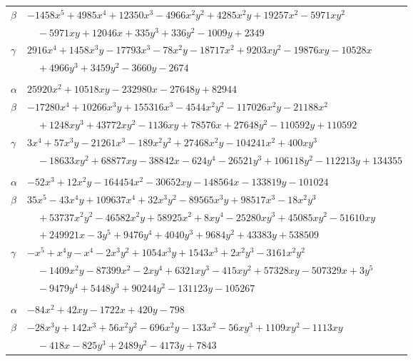\documentclass[11pt]{article}
\begin{document}
\begin{longtable}{@{}ll@{}}
$\beta$ & $-1458x^{5}+4985x^{4}+12350x^{3}-4966x^{2}y^{2}+4285x^{2}y+19257x^{2}-5971xy^{2}$\\
 & $\quad -5971xy+12046x+335y^{3}+336y^{2}-1009y+2349$\\
$\gamma$ & $2916x^{4}+1458x^{3}y-17793x^{3}-78x^{2}y-18717x^{2}+9203xy^{2}-19876xy-10528x$\\
 & $\quad +4966y^{3}+3459y^{2}-3660y-2674$\\
\addlinespace[3pt]
\multicolumn{2}{@{}l}{$\{i,j\}=\{2,91\}$, $k_{ij}=2^{10}\cdot 3^{3}\cdot 13$}\\
$\alpha$ & $25920x^{2}+10518xy-232980x-27648y+82944$\\
$\beta$ & $-17280x^{4}+10266x^{3}y+155316x^{3}-4544x^{2}y^{2}-117026x^{2}y-21188x^{2}$\\
 & $\quad +1248xy^{3}+43772xy^{2}-1136xy+78576x+27648y^{2}-110592y+110592$\\
$\gamma$ & $3x^{4}+57x^{3}y-21261x^{3}-189x^{2}y^{2}+27468x^{2}y-104241x^{2}+400xy^{3}$\\
 & $\quad -18633xy^{2}+68877xy-38842x-624y^{4}-26521y^{3}+106118y^{2}-112213y+134355$\\
\addlinespace[3pt]
\multicolumn{2}{@{}l}{$\{i,j\}=\{2,92\}$, $k_{ij}=2^{5}\cdot 3^{2}\cdot 7\cdot 13^{2}$}\\
$\alpha$ & $-52x^{3}+12x^{2}y-164454x^{2}-30652xy-148564x-133819y-101024$\\
$\beta$ & $35x^{5}-43x^{4}y+109637x^{4}+32x^{3}y^{2}-89565x^{3}y+98517x^{3}-18x^{2}y^{3}$\\
 & $\quad +53737x^{2}y^{2}-46582x^{2}y+58925x^{2}+8xy^{4}-25280xy^{3}+45085xy^{2}-51610xy$\\
 & $\quad +249921x-3y^{5}+9476y^{4}+4040y^{3}+9684y^{2}+43383y+538509$\\
$\gamma$ & $-x^{5}+x^{4}y-x^{4}-2x^{3}y^{2}+1054x^{3}y+1543x^{3}+2x^{2}y^{3}-3161x^{2}y^{2}$\\
 & $\quad -1409x^{2}y-87399x^{2}-2xy^{4}+6321xy^{3}-415xy^{2}+57328xy-507329x+3y^{5}$\\
 & $\quad -9479y^{4}+5448y^{3}+90244y^{2}-131123y-105267$\\
\addlinespace[3pt]
\multicolumn{2}{@{}l}{$\{i,j\}=\{2,93\}$, $k_{ij}=2^{5}\cdot 3^{2}\cdot 7^{2}$}\\
$\alpha$ & $-84x^{2}+42xy-1722x+420y-798$\\
$\beta$ & $-28x^{3}y+142x^{3}+56x^{2}y^{2}-696x^{2}y-133x^{2}-56xy^{3}+1109xy^{2}-1113xy$\\
 & $\quad -418x-825y^{3}+2489y^{2}-4173y+7843$\\

\end{longtable}
\end{document}
